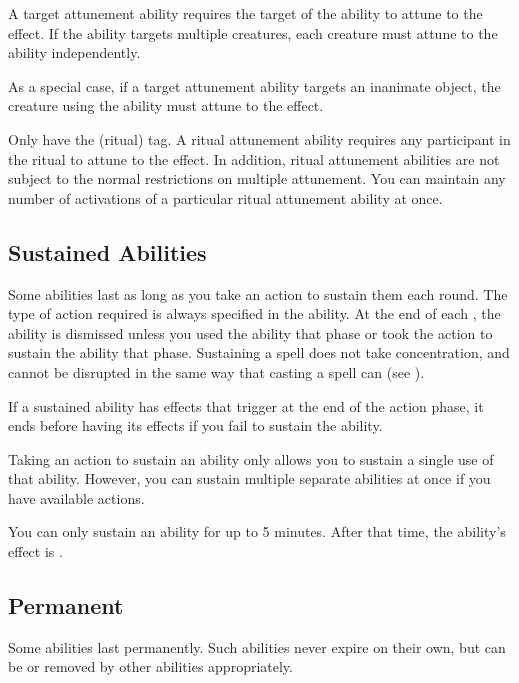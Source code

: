                  A target attunement ability requires the target of the ability to attune to the effect.
                If the ability targets multiple creatures, each creature must attune to the ability independently.

                As a special case, if a target attunement ability targets an inanimate object, the creature using the ability must attune to the effect.

                 Only  have the  (ritual) tag.
                A ritual attunement ability requires any participant in the ritual to attune to the effect.
                In addition, ritual attunement abilities are not subject to the normal restrictions on multiple attunement.
                You can maintain any number of activations of a particular ritual attunement ability at once.

        \subsection{Sustained Abilities}\label{Sustained Abilities}
            Some abilities last as long as you take an action to sustain them each round.
            The type of action required is always specified in the ability.
            At the end of each , the ability is dismissed unless you used the ability that phase or took the action to sustain the ability that phase.
            Sustaining a spell does not take concentration, and cannot be disrupted in the same way that casting a spell can (see ).

            If a sustained ability has effects that trigger at the end of the action phase, it ends before having its effects if you fail to sustain the ability.

            Taking an action to sustain an ability only allows you to sustain a single use of that ability.
            However, you can sustain multiple separate abilities at once if you have available actions.

            You can only sustain an ability for up to 5 minutes.
            After that time, the ability's effect is .

        \subsection{Permanent}
            Some abilities last permanently.
            Such abilities never expire on their own, but can be  or removed by other abilities appropriately.

